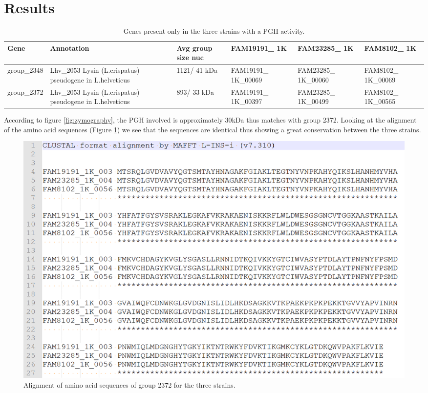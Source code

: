 \documentclass[10pt,a4paper]{article}
\begin{document}
\newpage
\section*{Results}





\begin{table}[htbp]
	\centering
	\begin{tabularx}{\linewidth}{|X|X|X|X|X|X|}
		\hline
		\textbf{Gene} & \textbf{Annotation} & \textbf{Avg group size nuc} & \textbf{FAM19191\_ 1K} & \textbf{FAM23285\_ 1K} & \textbf{FAM8102\_ 1K}\\
		 \hline
		group\_2348 & Lhv\_2053 Lysin (L.crispatus) pseudogene in L.helveticus & 1121/ 41 kDa & FAM19191\_ 1K\_00069 & FAM23285\_ 1K\_00060 & FAM8102\_ 1K\_00069 \\
		\hline
		group\_2372 & Lhv\_2053 Lysin (L.crispatus) pseudogene in L.helveticus & 893/ 33 kDa & FAM19191\_ 1K\_00397 & FAM23285\_ 1K\_00499 & FAM8102\_ 1K\_00565 \\
		\hline	
	\end{tabularx}
	\caption{Genes present only in the three strains with a PGH activity.}
	\label{tab:resultPGHexpr}
\end{table}

According to figure \ref{fig:zymography}, the PGH involved is approximately 30kDa thus matches with group 2372. Looking at the alignment of the amino acid sequences (Figure \ref{fig:alignmentgrp2372}) we see that the sequences are identical thus showing a great conservation between the three strains. \\




\begin{figure}
	\centering
	\includegraphics[width=0.6\linewidth]{img/AlignmentGrp2372}
	\caption{Alignment of amino acid sequences of group 2372 for the three strains.}
	\label{fig:alignmentgrp2372}
\end{figure}
\end{document}
